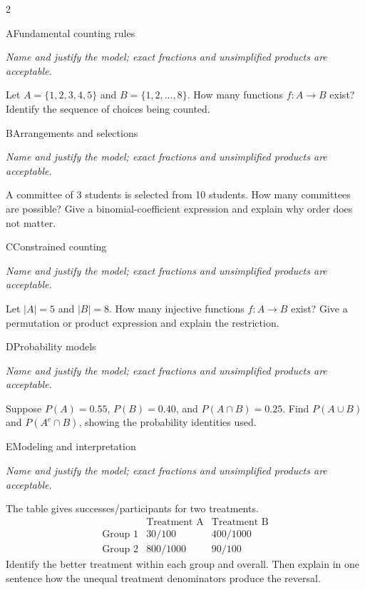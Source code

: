 \documentclass[9pt]{extarticle}
\begin{document}
\CoreWorkArea
\FormBreak
{}
\begin{multicols}{2}
\begin{CoreProblem}{A}{Fundamental counting rules}
{\scriptsize\textit{Name and justify the model; exact fractions and unsimplified products are acceptable.}\par}
Let $A=\{1,2,3,4,5\}$ and $B=\{1,2,\ldots,8\}$. How many functions
    $f:A\to B$ exist? Identify the sequence of choices being counted.
\end{CoreProblem}
\begin{CoreProblem}{B}{Arrangements and selections}
{\scriptsize\textit{Name and justify the model; exact fractions and unsimplified products are acceptable.}\par}
A committee of 3 students is selected from 10 students. How many
    committees are possible? Give a binomial-coefficient expression and explain
    why order does not matter.
\end{CoreProblem}
\begin{CoreProblem}{C}{Constrained counting}
{\scriptsize\textit{Name and justify the model; exact fractions and unsimplified products are acceptable.}\par}
Let $|A|=5$ and $|B|=8$. How many injective functions $f:A\to B$
    exist? Give a permutation or product expression and explain the restriction.
\end{CoreProblem}
\columnbreak
\begin{CoreProblem}{D}{Probability models}
{\scriptsize\textit{Name and justify the model; exact fractions and unsimplified products are acceptable.}\par}
Suppose $P(A)=0.55$, $P(B)=0.40$, and $P(A\cap B)=0.25$. Find
    $P(A\cup B)$ and $P(A^c\cap B)$, showing the probability identities used.
\end{CoreProblem}
\begin{CoreProblem}{E}{Modeling and interpretation}
{\scriptsize\textit{Name and justify the model; exact fractions and unsimplified products are acceptable.}\par}
The table gives successes/participants for two treatments.
    \[
    \begin{array}{c|cc}
      &\text{Treatment A}&\text{Treatment B}\\\hline
      \text{Group 1}&30/100&400/1000\\
      \text{Group 2}&800/1000&90/100
    \end{array}
    \]
    Identify the better treatment within each group and overall. Then explain in
    one sentence how the unequal treatment denominators produce the reversal.
\end{CoreProblem}
\end{multicols}
\end{document}
